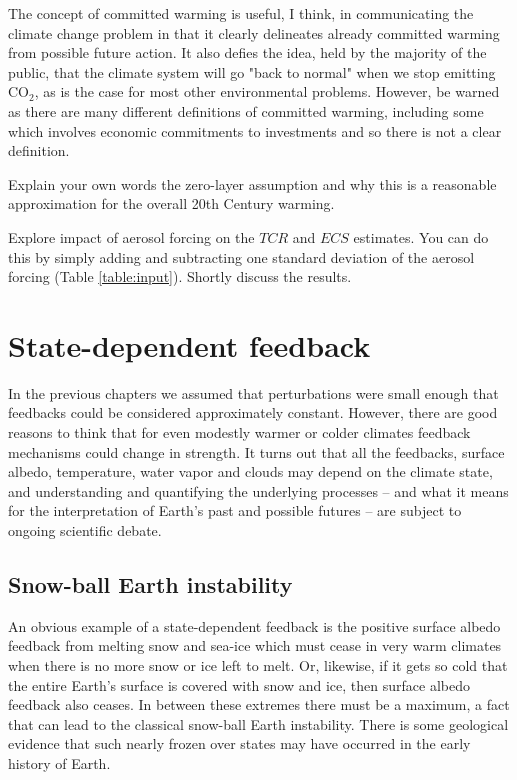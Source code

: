 \documentclass[12pt]{book}
\begin{document}
The concept of committed warming is useful, I think, in communicating the climate change problem in that it clearly delineates already committed warming from possible future action. It also defies the idea, held by the majority of the public, that the climate system will go "back to normal" when we stop emitting CO$_2$, as is the case for most other environmental problems. However, be warned as there are many different definitions of committed warming, including some which involves economic commitments to investments and so there is not a clear definition.


\newpage
\vspace{1 cm}
{\setlength{\parindent}{0cm}

	\begin{exercise}
	Explain your own words the zero-layer assumption and why this is a reasonable approximation for the overall 20th Century warming.
	\end{exercise}


	\begin{exercise}
	Explore impact of aerosol forcing on the $TCR$ and $ECS$ estimates. You can do this by simply adding and subtracting one standard deviation of the aerosol forcing (Table \ref{table:input}). Shortly discuss the results.
	\end{exercise}
}

\chapter{State-dependent feedback}
\label{chapter:state-dependent}
In the previous chapters we assumed that perturbations were small enough that feedbacks could be considered approximately constant. However, there are good reasons to think that for even modestly warmer or colder climates  feedback mechanisms could change in strength. 
It turns out that all the feedbacks, surface albedo, temperature, water vapor and clouds may depend on the climate state, and understanding and quantifying the underlying processes -- and what it means for the interpretation of Earth's past and possible futures -- are subject to ongoing scientific debate. %



\section{Snow-ball Earth instability}
An obvious example of a state-dependent feedback is the positive surface albedo feedback from melting snow and sea-ice which must cease in very warm climates when there is no more snow or ice left to melt. Or, likewise, if it gets so cold that the entire Earth's surface is covered with snow and ice, then surface albedo feedback also ceases. In between these extremes there must be a maximum, a fact that can lead to the classical snow-ball Earth instability. There is some geological evidence that such nearly frozen over states may have occurred in the early history of Earth.
\end{document}
